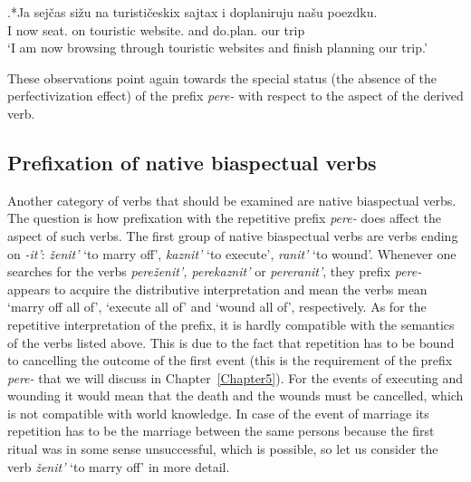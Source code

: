 \exg.*Ja sej\v{c}as si\v{z}u na turisti\v{c}eskix sajtax i doplaniruju na\v{s}u poezdku.\label{ex:doplaniruju}\\
I now seat. on touristic website. and do.plan. our trip\\
\vspace{0.5em}
`I am now browsing through touristic websites and finish planning our trip.'

These observations point again towards the special status (the absence of the perfectivization effect) of the prefix \textit{pere-} with respect to the aspect of the derived verb.

\subsection{Prefixation of native biaspectual verbs}\label{subsection:perf:native}
Another category of verbs that should be examined are native biaspectual verbs. The question is how prefixation with the repetitive prefix \textit{pere-} does affect the aspect of such verbs. The first group of native biaspectual verbs are verbs ending on \textit{-it'}: \textit{\v{z}enit'} `to marry off', \textit{kaznit'} `to execute', \textit{ranit'} `to wound'. Whenever one searches for the verbs \textit{pere\v{z}enit', perekaznit'} or \textit{pereranit'}, they prefix \textit{pere-} appears to acquire the distributive interpretation and mean the verbs mean `marry off all of', `execute all of' and `wound all of', respectively. As for the repetitive interpretation of the prefix, it is hardly compatible with the semantics of the verbs listed above. This is due to the fact that repetition has to be bound to cancelling the outcome of the first event (this is the requirement of the prefix \textit{pere-} that we will discuss in Chapter~\ref{Chapter5}). For the events of executing and wounding it would mean that the death and the wounds must be cancelled, which is not compatible with world knowledge. In case of the event of marriage its repetition has to be the marriage between the same persons because the first ritual was in some sense unsuccessful, which is possible, so let us consider the verb \textit{\v{z}enit'} `to marry off' in more detail. 

